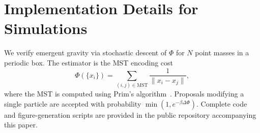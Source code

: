 \documentclass[aps,preprint,onecolumn,longbibliography,nofootinbib]{revtex4-2}
\numberwithin{equation}{section}        %
\begin{document}
\section{Implementation Details for Simulations}\label{app:D}
We verify emergent gravity via stochastic descent of $\Phi$ for $N$ point masses in a periodic box. The estimator is the MST encoding cost
\begin{equation}
\Phi(\{x_i\}) = \sum_{(i,j)\in \mathrm{MST}} \frac{1}{\|x_i - x_j\|}, \label{eq:D1}
\end{equation}
where the MST is computed using Prim's algorithm~\cite{Prim1957}. Proposals modifying a single particle are accepted with probability $\min(1,e^{-\beta \Delta \Phi})$. Complete code and figure-generation scripts are provided in the public repository accompanying this paper.

\end{document}

